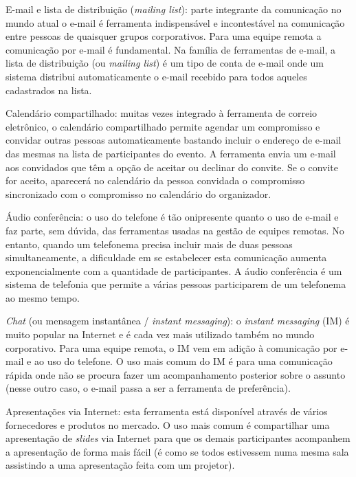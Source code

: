 \documentclass[12pt]{article} %
\begin{document}
\begin{description}

\item{E-mail e lista de distribuição (\textit{mailing list}):} parte integrante da comunicação no mundo atual o e-mail é ferramenta indispensável e incontestável
    na comunicação entre pessoas de quaisquer grupos corporativos. Para uma equipe remota a comunicação por e-mail
    é fundamental. Na família de ferramentas de e-mail, a lista de distribuição (ou \textit{mailing list}) é um tipo de
                                          conta de e-mail onde um sistema distribui automaticamente o e-mail recebido para todos
                                          aqueles cadastrados na lista. 

\item{Calendário compartilhado}: muitas vezes integrado à ferramenta de correio eletrônico, o calendário compartilhado
	permite agendar um compromisso e convidar outras pessoas automaticamente bastando incluir o endereço de
	e-mail das mesmas na lista de participantes do evento. A ferramenta envia um e-mail aos convidados que têm a opção
	de aceitar ou declinar do convite. Se o convite for aceito, aparecerá no calendário da pessoa convidada 
	o compromisso sincronizado com o compromisso no calendário do organizador. 


\item{Áudio conferência:} o uso do telefone é tão onipresente quanto o uso de e-mail e faz parte, sem dúvida, das 
    ferramentas usadas na gestão de equipes remotas. No entanto, quando um 
    telefonema precisa incluir mais de duas pessoas simultaneamente, a dificuldade em se estabelecer esta comunicação
    aumenta exponencialmente com a quantidade de participantes. A áudio
    conferência é um sistema de telefonia que permite a várias pessoas participarem de um telefonema ao mesmo tempo. 


\item{\textit{Chat} (ou mensagem instantânea / \textit{instant messaging}):} o \textit{instant messaging} (IM) é muito popular na Internet e 
    é cada vez mais utilizado também no mundo corporativo. Para uma equipe remota, o IM vem em adição à 
    comunicação por e-mail e ao uso do telefone. O uso mais comum do IM é para uma comunicação rápida onde não se procura fazer um 
    acompanhamento posterior sobre o assunto (nesse outro caso, o e-mail passa a ser a ferramenta de preferência).  
    

\item{Apresentações via Internet:} esta ferramenta está disponível através de vários fornecedores e produtos no mercado. O uso mais
    comum é compartilhar uma apresentação de \textit{slides} via Internet para que os demais participantes acompanhem
    a apresentação de forma mais fácil (é como se todos estivessem numa mesma sala assistindo a uma apresentação
    feita com um projetor). 


\end{description}
\end{document}
